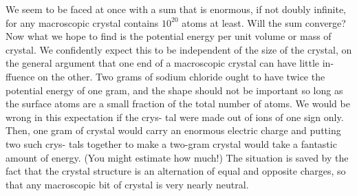 We seem to be faced at once with a sum that is enormous, if not
doubly infinite, for any macroscopic crystal contains $10^{20}$ atoms at
least. Will the sum converge? Now what we hope to find is the
potential energy per unit volume or mass of crystal. We confidently
expect this to be independent of the size of the crystal, on the general
argument that one end of a macroscopic crystal can have little in-
ffuence on the other. Two grams of sodium chloride ought to have
twice the potential energy of one gram, and the shape should not be
important so long as the surface atoms are a small fraction of the total
number of atoms. We would be wrong in this expectation if the crys-
tal were made out of ions of one sign only. Then, one gram of crystal
would carry an enormous electric charge and putting two such crys-
tals together to make a two-gram crystal would take a fantastic
amount of energy. (You might estimate how much!) The situation
is saved by the fact that the crystal structure is an alternation of equal
and opposite charges, so that any macroscopic bit of crystal is very
nearly neutral.

